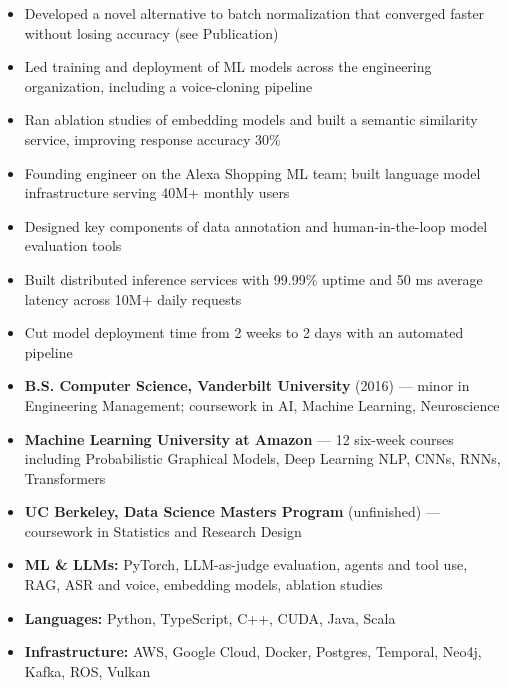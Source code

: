 \documentclass{my_cv}
\begin{document}

\begin{itemize}
\item Developed a novel alternative to batch normalization that converged faster without losing accuracy (see Publication)
\item Led training and deployment of ML models across the engineering organization, including a voice-cloning pipeline
\item Ran ablation studies of embedding models and built a semantic similarity service, improving response accuracy 30\%
\end{itemize}


\begin{itemize}
\item Founding engineer on the Alexa Shopping ML team; built language model infrastructure serving 40M+ monthly users
\item Designed key components of data annotation and human-in-the-loop model evaluation tools
\item Built distributed inference services with 99.99\% uptime and 50 ms average latency across 10M+ daily requests
\item Cut model deployment time from 2 weeks to 2 days with an automated pipeline
\end{itemize}


\begin{itemize}
\item \textbf{B.S. Computer Science, Vanderbilt University} (2016) --- minor in Engineering Management; coursework in AI, Machine Learning, Neuroscience
\item \textbf{Machine Learning University at Amazon} --- 12 six-week courses including Probabilistic Graphical Models, Deep Learning NLP, CNNs, RNNs, Transformers
\item \textbf{UC Berkeley, Data Science Masters Program} (unfinished) --- coursework in Statistics and Research Design
\end{itemize}


\begin{itemize}
\item \textbf{ML \& LLMs:} PyTorch, LLM-as-judge evaluation, agents and tool use, RAG, ASR and voice, embedding models, ablation studies
\item \textbf{Languages:} Python, TypeScript, C++, CUDA, Java, Scala
\item \textbf{Infrastructure:} AWS, Google Cloud, Docker, Postgres, Temporal, Neo4j, Kafka, ROS, Vulkan
\end{itemize}
\end{document}

